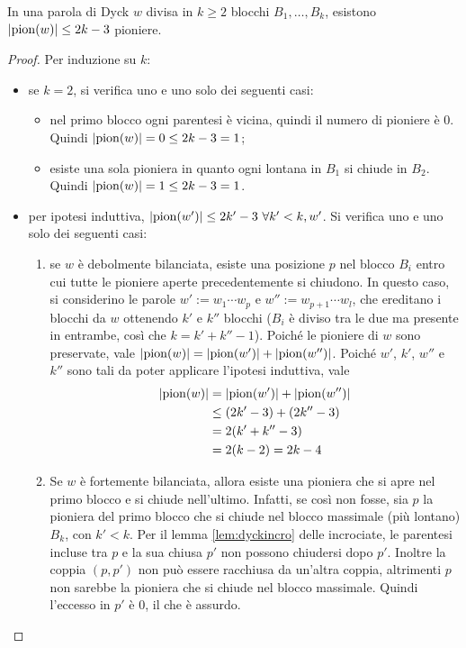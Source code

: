 \begin{theorem}
	In una parola di Dyck $w$ divisa in $k\geq 2$ blocchi $B_1,\dots,B_k$, esistono $| \mathrm{pion}(w) |\leq 2k-3$ pioniere.
\end{theorem}
\begin{proof}
	Per induzione su $k$:
	\begin{itemize}
		\item se $k=2$, si verifica uno e uno solo dei seguenti casi:
		      \begin{itemize}
			      \item nel primo blocco ogni parentesi è vicina, quindi il numero di pioniere è $0$. Quindi $| \mathrm{pion}(w) |=0\leq 2k-3=1$;
			      \item esiste una sola pioniera in quanto ogni lontana in $B_1$ si chiude in $B_2$. Quindi $| \mathrm{pion}(w) |=1\leq 2k-3=1$.
		      \end{itemize}
		\item per ipotesi induttiva, $| \mathrm{pion}(w') |\leq 2k'-3~\forall k'<k,w'$. Si verifica uno e uno solo dei seguenti casi:
		      \begin{enumerate}
			      \item \label{en:dythm:1} se $w$ è debolmente bilanciata, esiste una posizione $p$ nel blocco $B_i$ entro cui tutte le pioniere aperte precedentemente si chiudono.
			            In questo caso, si considerino le parole $w':=w_1\cdots w_p$ e $w'':=w_{p+1}\cdots w_l$, che ereditano i blocchi da $w$ ottenendo $k'$ e $k''$ blocchi ($B_i$ è diviso tra le due ma presente in entrambe, così che $k=k'+k''-1$).
			            Poiché le pioniere di $w$ sono preservate, vale $| \mathrm{pion}(w) |=| \mathrm{pion}(w') |+| \mathrm{pion}(w'') |$.
			            Poiché $w'$, $k'$, $w''$ e $k''$ sono tali da poter applicare l'ipotesi induttiva, vale
			            \begin{align*}
				            | \mathrm{pion}(w) | & = | \mathrm{pion}(w') |+| \mathrm{pion}(w'') | \\
				                              & \leq (2k'-3)+(2k''-3)                    \\
				                              & = 2(k'+k''-3)                            \\
				                              & = 2(k-2) = 2k-4
			            \end{align*}
			      \item Se $w$ è fortemente bilanciata, allora esiste una pioniera che si apre nel primo blocco e si chiude nell'ultimo. Infatti, se così non fosse, sia $p$ la pioniera del primo blocco che si chiude nel blocco massimale (più lontano) $B_k$, con $k'<k$. Per il lemma \ref{lem:dyckincro} delle incrociate, le parentesi incluse tra $p$ e la sua chiusa $p'$ non possono chiudersi dopo $p'$. Inoltre la coppia $(p,p')$ non può essere racchiusa da un'altra coppia, altrimenti $p$ non sarebbe la pioniera che si chiude nel blocco massimale. Quindi l'eccesso in $p'$ è $0$, il che è assurdo.


\end{enumerate}
\end{itemize}
\end{proof}
